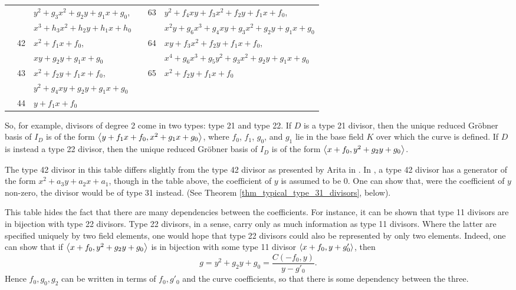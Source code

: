 \begin{table}[hb!]
\begin{center}
\begin{tabular}{l|l|l||l|l|l}
  \cline{5-6}
    & & $y^2 + g_3x^2 + g_2y + g_1x + g_0$, & &\multirow{2}{*}{63} & $y^2 + f_4xy + f_3x^2 + f_2y + f_1x + f_0$, \\
    & & $x^3 + h_3x^2 + h_2y + h_1x + h_0$ & & & $x^2y + g_6x^3 + g_4xy + g_3x^2 + g_2y + g_1x + g_0$ \\
    \cline{2-3}\cline{5-6}
    &\multirow{2}{*}{42} & $x^2 + f_1x + f_0$, & &\multirow{2}{*}{64} & $xy + f_3x^2 + f_2y + f_1x + f_0$, \\
    & & $xy + g_2y + g_1x + g_0$ & & & $x^4 + g_6x^3 + g_5y^2 + g_3x^2 + g_2y + g_1x + g_0$ \\
    \cline{2-3}\cline{5-6}
    &\multirow{2}{*}{43} & $x^2 + f_2y + f_1x + f_0$, & &\multirow{1}{*}{65} & $x^2 + f_2y + f_1x + f_0$ \\
    \cline{4-6}
    & & $y^2 + g_4xy + g_2y + g_1x + g_0$ \\
    \cline{2-3}
    &\multirow{1}{*}{44}
      & $y + f_1x + f_0$
\end{tabular}
\end{center}
\end{table}

So, for example, divisors of degree 2 come in two types: type 21 and type 22.
If $D$ is a type 21 divisor,
then the unique reduced Gr\"obner basis of $I_D$ is of the form $\left\langle y + f_1x + f_0, x^2 + g_1x + g_0 \right\rangle$,
where $f_0$, $f_1$, $g_0$, and $g_1$ lie in the base field $K$ over which the curve is defined.
If $D$ is instead a type 22 divisor,
then the unique reduced Gr\"obner basis of $I_D$ is of the form $\left\langle x + f_0, y^2 + g_2y + g_0 \right\rangle$.

The type 42 divisor in this table differs slightly from the type 42 divisor as presented by Arita in \cite{arita05-2}.
In \cite{arita05-2}, a type 42 divisor has a generator of the form $x^2 + a_3y + a_2x + a_1$,
though in the table above, the coefficient of $y$ is assumed to be 0.
One can show that, were the coefficient of $y$ non-zero, the divisor would be of type 31 instead.
(See Theorem \ref{thm_typical_type_31_divisors}, below).

This table hides the fact that there are many dependencies between the coefficients.
For instance, it can be shown that type 11 divisors are in bijection with type 22 divisors.
Type 22 divisors, in a sense, carry only as much information as type 11 divisors.
Where the latter are specified uniquely by two field elements,
one would hope that type 22 divisors could also be represented by only two elements.
Indeed, one can show that if $\left\langle x + f_0, y^2 + g_2y + g_0 \right\rangle$
is in bijection with some type 11 divisor $\left\langle x + f_0, y + g'_0 \right\rangle$, then
  \[ g = y^2 + g_2y + g_0 = \frac {C(-f_0, y)}{y - g'_0}. \]
Hence $f_0, g_0, g_2$ can be written in terms of $f_0, g'_0$ and the curve coefficients,
so that there is some dependency between the three.

